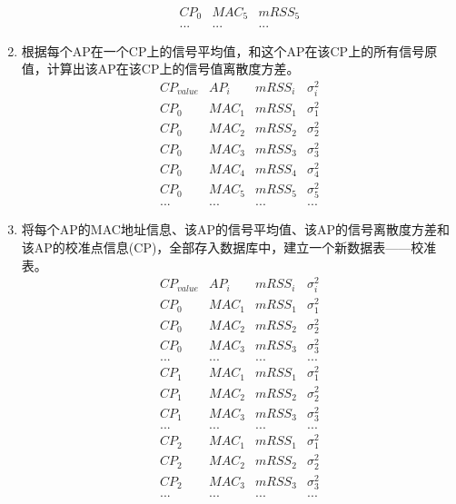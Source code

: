 \documentclass[UTF8, twocolumn ]{ctexart}
\begin{document}
\begin{enumerate}
\begin{equation}
\begin{array}{c|c|c}
      CP_{0} & MAC_{5} & mRSS_{5} \\
      ... & ... & ...
    \end{array}
  \end{equation}
\item 根据每个AP在一个CP上的信号平均值，和这个AP在该CP上的所有信号原值，计算出该AP在该CP上的信号值离散度方差。
  \begin{equation}
    \begin{array}{c|c|c|c}
      CP_{value} & AP_{i} & mRSS_{i} & \sigma^{2}_{i} \\ \hline
      CP_{0} & MAC_{1} & mRSS_{1} & \sigma^{2}_{1} \\
      CP_{0} & MAC_{2} & mRSS_{2} & \sigma^{2}_{2} \\
      CP_{0} & MAC_{3} & mRSS_{3} & \sigma^{2}_{3} \\
      CP_{0} & MAC_{4} & mRSS_{4} & \sigma^{2}_{4} \\
      CP_{0} & MAC_{5} & mRSS_{5} & \sigma^{2}_{5} \\
      ... & ... & ... & ...
    \end{array}
  \end{equation}
\item 将每个AP的MAC地址信息、该AP的信号平均值、该AP的信号离散度方差和该AP的校准点信息(CP)，全部存入数据库中，建立一个新数据表——校准表。
  \begin{equation}
    \begin{array}{c|c|c|c}
      CP_{value} & AP_{i} & mRSS_{i} & \sigma^{2}_{i} \\ \hline
      CP_{0} & MAC_{1} & mRSS_{1} & \sigma^{2}_{1} \\
      CP_{0} & MAC_{2} & mRSS_{2} & \sigma^{2}_{2} \\
      CP_{0} & MAC_{3} & mRSS_{3} & \sigma^{2}_{3} \\
      ... & ... & ... & ... \\
      CP_{1} & MAC_{1} & mRSS_{1} & \sigma^{2}_{1} \\
      CP_{1} & MAC_{2} & mRSS_{2} & \sigma^{2}_{2} \\
      CP_{1} & MAC_{3} & mRSS_{3} & \sigma^{2}_{3} \\
      ... & ... & ... & ... \\
      CP_{2} & MAC_{1} & mRSS_{1} & \sigma^{2}_{1} \\
      CP_{2} & MAC_{2} & mRSS_{2} & \sigma^{2}_{2} \\
      CP_{2} & MAC_{3} & mRSS_{3} & \sigma^{2}_{3} \\
      ... & ... & ... & ...
    \end{array}
  \end{equation}
\end{enumerate}
\end{document}
